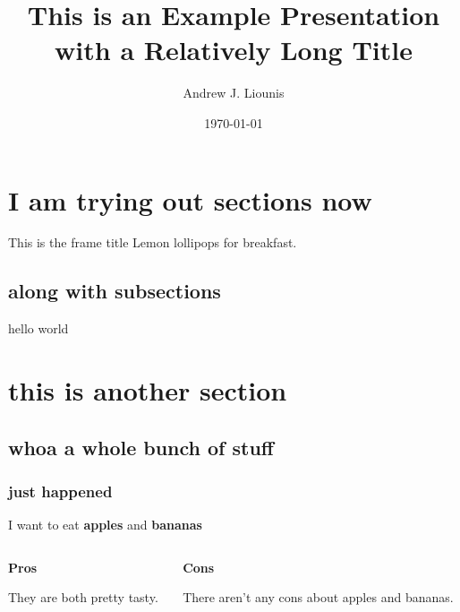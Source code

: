 \documentclass[xcolor=table]{beamer}
\title{This is an Example Presentation with a Relatively Long Title}
\date{\today}
\author{Andrew J. Liounis}
\begin{document}
\begin{frame}
    \titlepage
\end{frame}

\begin{frame}[t]
    \frametitle{{\bfseries\toctitle}}
    \tableofcontents
\end{frame}

\section{I am trying out sections now}

\begin{frame}{This is the frame title}
    Lemon lollipops for breakfast.
\end{frame}

\subsection{along with subsections}
\begin{frame}[plain]
    hello world
\end{frame}

\section{this is another section}
\subsection{whoa a whole bunch of stuff}
\subsubsection{just happened}

\begin{frame}{I want to eat \textbf{apples} and \textbf{bananas}}
    \begin{columns}
        \centering
        \begin{column}[t]{0.47\textwidth}
            \centering
            \textbf{Pros}

            They are both pretty tasty.
        \end{column}
        \begin{column}[t]{0.47\textwidth}
            \centering
            \textbf{Cons}

            There aren't any cons about apples and bananas.
        \end{column}
    \end{columns}
\end{frame}
\end{document}
